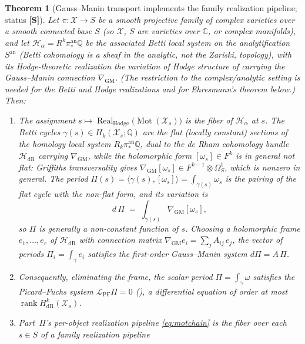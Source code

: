 \documentclass[12pt]{article}
\newtheorem{theorem}{Theorem}[section]
\theoremstyle{definition}
\theoremstyle{remark}
\newcommand{\Mot}{\operatorname{Mot}}
\newcommand{\Real}{\operatorname{Real}}
\newcommand{\CC}{\mathbb{C}}
\newcommand{\QQ}{\mathbb{Q}}
\newcommand{\rk}{\operatorname{rank}}
\newcommand{\GM}{\nabla_{\mathrm{GM}}}
\newcommand{\status}[1]{\textnormal{\textsf{\textbf{[#1]}}}}
\begin{document}
\begin{theorem}[Gauss--Manin transport implements the family realization pipeline; status \status{S}]
\label{thm:gm}
Let $\pi\colon\mathcal X\to S$ be a smooth projective family of complex varieties over a smooth connected
base $S$ (so $\mathcal X$, $S$ are varieties over $\CC$, or complex manifolds), and let
$\mathcal H_\alpha = R^k\pi^{\mathrm{an}}_\ast\underline{\QQ}$ be the associated Betti local system on the
analytification $S^{\mathrm{an}}$ (Betti cohomology is a sheaf in the analytic, not the Zariski,
topology), with its Hodge-theoretic realization the variation of Hodge structure of 
carrying the Gauss--Manin connection $\GM$. (The restriction to the complex/analytic setting is needed for
the Betti and Hodge realizations and for Ehresmann's theorem below.) Then:
\begin{enumerate}
  \item The assignment $s\mapsto \Real_{\mathrm{Hodge}}\bigl(\Mot(\mathcal X_s)\bigr)$ is the fiber of
  $\mathcal H_\alpha$ at $s$. The Betti cycles $\gamma(s)\in H_k(\mathcal X_s;\QQ)$ are the \emph{flat}
  (locally constant) sections of the \emph{homology} local system
  $R_k\pi^{\mathrm{an}}_\ast\underline{\QQ}$, dual to the de Rham cohomology bundle
  $\mathcal H_{\mathrm{dR}}$ carrying $\GM$, while the holomorphic form
  $[\omega_s]\in F^k$ is in general \emph{not} flat: Griffiths transversality gives
  $\GM[\omega_s]\in F^{k-1}\otimes\Omega^1_S$, which is nonzero in general. The period
  $\Pi(s)=\langle\gamma(s),[\omega_s]\rangle=\int_{\gamma(s)}\omega_s$ is the pairing of the flat cycle
  with the non-flat form, and its variation is
  \[
    d\,\Pi \;=\; \int_{\gamma(s)}\GM[\omega_s],
  \]
  so $\Pi$ is generally a non-constant function of $s$. Choosing a holomorphic frame $e_1,\dots,e_r$ of
  $\mathcal H_{\mathrm{dR}}$ with connection matrix $\GM e_i = \sum_j A_{ij}\,e_j$, the vector of periods
  $\Pi_i=\int_{\gamma}e_i$ satisfies the first-order Gauss--Manin system $d\Pi = A\,\Pi$.
  \item Consequently, eliminating the frame, the scalar period $\Pi=\int_\gamma\omega$ satisfies the
  Picard--Fuchs system $\mathcal L_{\mathrm{PF}}\Pi = 0$ (), a differential equation of order
  at most $\rk H^k_{\mathrm{dR}}(\mathcal X_s)$.
  \item Part~II's per-object realization pipeline \eqref{eq:motchain} is the fiber over each $s\in S$
  of a \emph{family} realization pipeline
  \[
  \begin{tikzcd}[column sep=1.5cm]

\end{tikzcd}\]
\end{enumerate}
\end{theorem}
\end{document}
